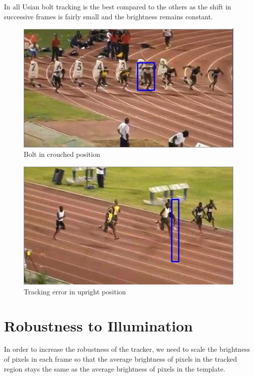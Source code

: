 \documentclass[12pt]{article}
\begin{document}
In all Usian bolt tracking is the best compared to the others as the shift in successive frames is fairly small and the brightness remains constant.
\newpage
\begin{figure}[h]
    \centering
    \includegraphics[width=12cm]{trackbolt3}
    \caption{Bolt in crouched position}
    \label{fig:Bolt in crouched position}
\end{figure}
\begin{figure}[h]
    \centering
    \includegraphics[width=12cm]{trackbolt4}
    \caption{Tracking error in upright position}
    \label{fig:Tracking error in upright position}
\end{figure}

\section{Robustness to Illumination}
In order to increase the robustness of the tracker, we need to scale the brightness of pixels in each frame so that the average brightness of pixels in the tracked region stays the same as the average brightness of pixels in the template. 
\end{document}
